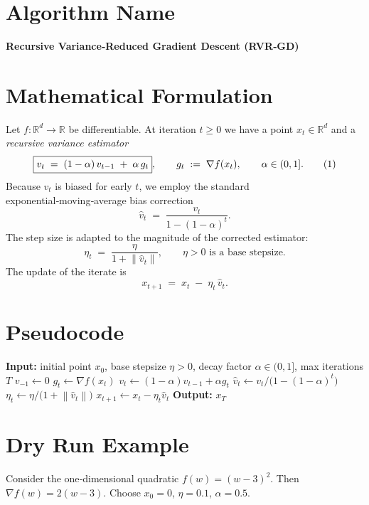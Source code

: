 \documentclass{article}
\newcommand{\norm}[1]{\left\|#1\right\|}
\begin{document}
\section*{Algorithm Name}
\textbf{Recursive Variance‑Reduced Gradient Descent (RVR‑GD)}  

\section*{Mathematical Formulation}
Let $f:\mathbb{R}^d\to\mathbb{R}$ be differentiable.  
At iteration $t\ge 0$ we have a point $x_t\in\mathbb{R}^d$ and a \emph{recursive variance estimator}
\[
\boxed{%
v_t \;=\;(1-\alpha)\,v_{t-1}\;+\;\alpha\,g_t},
\qquad 
g_t\;:=\;\nabla f(x_t),\qquad \alpha\in(0,1].
\tag{1}
\]
Because $v_t$ is biased for early $t$, we employ the standard exponential‑moving‑average bias correction
\[
\boxed{\hat v_t \;=\;\frac{v_t}{1-(1-\alpha)^t}} .
\tag{2}
\]
The step size is adapted to the magnitude of the corrected estimator:
\[
\boxed{\eta_t \;=\;\frac{\eta}{1+\norm{\hat v_t}}},\qquad \eta>0\text{ is a base stepsize.}
\tag{3}
\]
The update of the iterate is
\[
\boxed{x_{t+1}\;=\;x_t\;-\;\eta_t\,\hat v_t } .
\tag{4}
\]

\section*{Pseudocode}
\begin{algorithm}[H]
\caption{Recursive Variance‑Reduced Gradient Descent (RVR‑GD)}
\begin{algorithmic}[1]
\State \textbf{Input:} initial point $x_0$, base stepsize $\eta>0$, decay factor $\alpha\in(0,1]$, max iterations $T$
\State $v_{-1}\gets 0$ 
    \State $g_t \gets \nabla f(x_t)$
    \State $v_t \gets (1-\alpha)v_{t-1} + \alpha g_t$ \label{alg:est}
    \State $\hat v_t \gets v_t / \bigl(1-(1-\alpha)^t\bigr)$ 
    \State $\eta_t \gets \eta / \bigl(1+\norm{\hat v_t}\bigr)$
    \State $x_{t+1} \gets x_t - \eta_t \hat v_t$
\EndFor
\State \textbf{Output:} $x_T$
\end{algorithmic}
\end{algorithm}

\section*{Dry Run Example}
Consider the one‑dimensional quadratic $f(w)=(w-3)^2$.  
Then $\nabla f(w)=2(w-3)$.  Choose $x_0=0$, $\eta=0.1$, $\alpha=0.5$.
\end{document}
